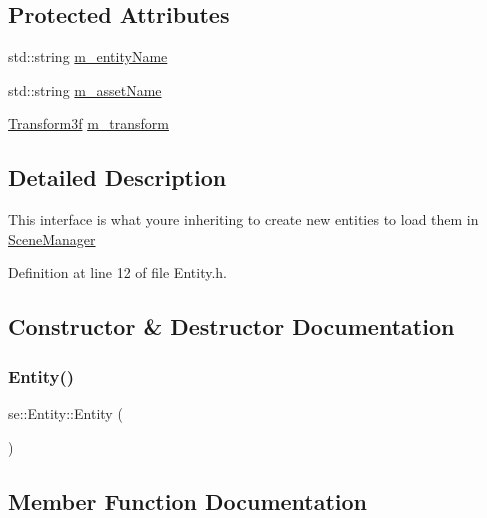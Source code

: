 \subsection*{Protected Attributes}
\begin{DoxyCompactItemize}
\item 
std\+::string \mbox{\hyperlink{classse_1_1_entity_ad4e3cc82e88be87565d00fdf10c18b12}{m\+\_\+entity\+Name}}
\item 
std\+::string \mbox{\hyperlink{classse_1_1_entity_aba1f7cc3700caee65b20c423185ab7ca}{m\+\_\+asset\+Name}}
\item 
\mbox{\hyperlink{classse_1_1_transform3f}{Transform3f}} \mbox{\hyperlink{classse_1_1_entity_a85a408963ce0920c7bc3bfec29266238}{m\+\_\+transform}}
\end{DoxyCompactItemize}


\subsection{Detailed Description}
This interface is what you\textquotesingle{}re inheriting to create new entities to load them in \mbox{\hyperlink{classse_1_1_scene_manager}{Scene\+Manager}} 

Definition at line 12 of file Entity.\+h.



\subsection{Constructor \& Destructor Documentation}
\mbox{\label{classse_1_1_entity_ac92492302d50c22ba7c4e9ff016b6145}} 
\subsubsection{\texorpdfstring{Entity()}{Entity()}}
{\footnotesize\ttfamily se\+::\+Entity\+::\+Entity (\begin{DoxyParamCaption}{ }\end{DoxyParamCaption})}



\subsection{Member Function Documentation}
\mbox{\label{classse_1_1_entity_af1d512cba984ffe167decd7ecf7a88f4}} 
